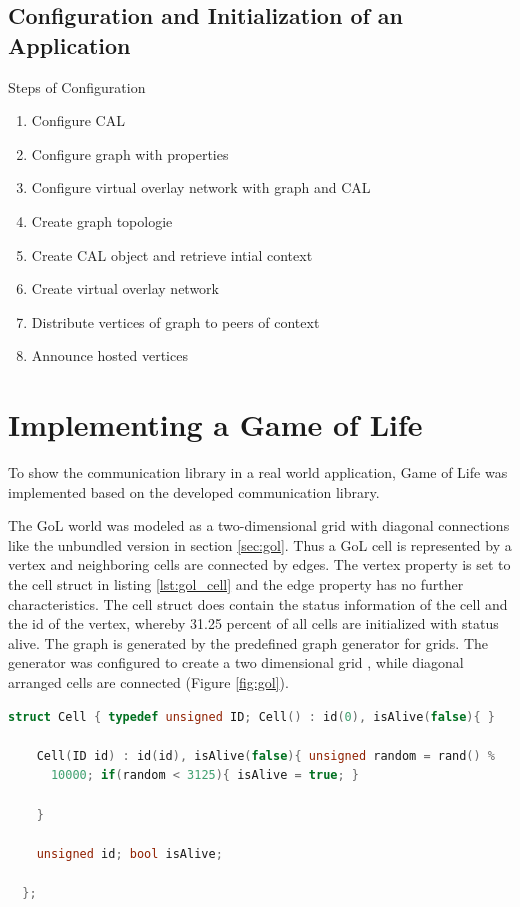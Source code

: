 \subsection{Configuration and Initialization of an Application}

Steps of Configuration

\begin{enumerate}
\item Configure CAL
\item Configure graph with properties
\item Configure virtual overlay network with graph and CAL

\item Create graph topologie
\item Create CAL object and retrieve intial context
\item Create virtual overlay network

\item Distribute vertices of graph to peers of context
\item Announce hosted vertices
\end{enumerate}

\section{Implementing a Game of Life}
\label{sec:gol_imp}
To show the communication library in a real world application, Game of
Life was implemented based on the developed communication library.

The GoL world was modeled as a two-dimensional grid with diagonal
connections like the unbundled version in section \ref{sec:gol}. Thus
a GoL cell is represented by a vertex and neighboring cells are
connected by edges. The vertex property is set to the cell struct in
listing \ref{lst:gol_cell} and the edge property has no further
characteristics. The cell struct does contain the status information
of the cell and the id of the vertex, whereby 31.25 percent of all
cells are initialized with status alive.  The graph is generated by
the predefined graph generator for grids. The generator was configured
to create a two dimensional grid , while diagonal arranged cells are
connected (Figure \ref{fig:gol}).

\begin{lstlisting}[language=C++, label=lst:gol_cell]
  struct Cell { typedef unsigned ID; Cell() : id(0), isAlive(false){ }

    Cell(ID id) : id(id), isAlive(false){ unsigned random = rand() %
      10000; if(random < 3125){ isAlive = true; }

    }
    
    unsigned id; bool isAlive;

  };
\end{lstlisting}

